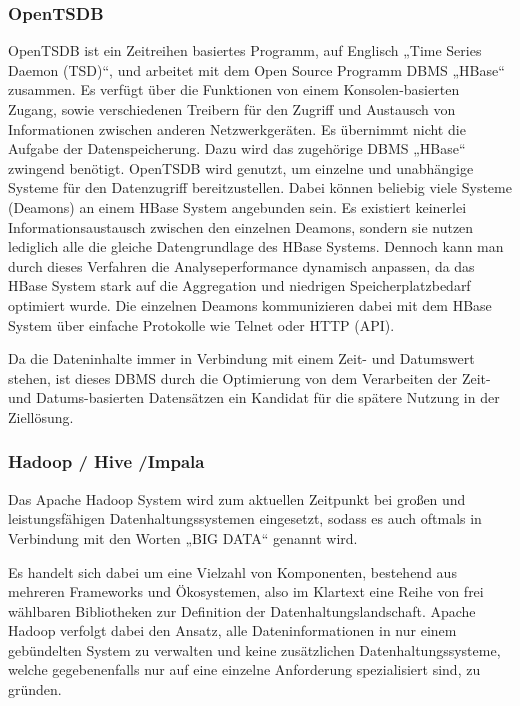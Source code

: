 \subsubsection{OpenTSDB}
\label{subsubsec:opentsdb}
OpenTSDB ist ein Zeitreihen basiertes Programm, auf Englisch „Time Series
Daemon (TSD)“, und arbeitet mit dem Open Source Programm \gls{DBMS} „HBase“
zusammen. Es verfügt über die Funktionen von einem Konsolen-basierten Zugang,
sowie verschiedenen Treibern für den Zugriff und Austausch von Informationen
zwischen anderen Netzwerkgeräten. Es übernimmt nicht die Aufgabe der
Datenspeicherung. Dazu wird das zugehörige \gls{DBMS} „HBase“ zwingend
benötigt. OpenTSDB wird genutzt, um einzelne und unabhängige Systeme für den
Datenzugriff bereitzustellen. Dabei können beliebig viele Systeme (Deamons) an
einem HBase System angebunden sein. Es existiert keinerlei
Informationsaustausch zwischen den einzelnen Deamons, sondern sie nutzen
lediglich alle die gleiche Datengrundlage des HBase Systems. Dennoch kann man
durch dieses Verfahren die Analyseperformance dynamisch anpassen, da das HBase
System stark auf die Aggregation und niedrigen Speicherplatzbedarf optimiert
wurde. Die einzelnen Deamons kommunizieren dabei mit dem HBase System über
einfache Protokolle wie Telnet oder HTTP (API).

Da die Dateninhalte immer in Verbindung mit einem Zeit- und Datumswert stehen,
ist dieses \gls{DBMS} durch die Optimierung von dem Verarbeiten der Zeit- und
Datums-basierten Datensätzen ein Kandidat für die spätere Nutzung in der
Ziellösung.
\nl%

\subsubsection{Hadoop / Hive /Impala}
\label{subsubsec:hadoop_hive_impala}
Das Apache Hadoop System wird zum aktuellen Zeitpunkt bei
großen und leistungsfähigen Datenhaltungssystemen eingesetzt, sodass es
auch oftmals in Verbindung mit den Worten „BIG DATA“ genannt wird.

Es handelt sich dabei um eine Vielzahl von Komponenten, bestehend aus mehreren
Frameworks und Ökosystemen, also im Klartext eine Reihe von frei wählbaren
Bibliotheken zur Definition der Datenhaltungslandschaft. Apache Hadoop verfolgt
dabei den Ansatz, alle Dateninformationen in nur einem gebündelten System zu
verwalten und keine zusätzlichen Datenhaltungssysteme, welche gegebenenfalls
nur auf eine einzelne Anforderung spezialisiert sind, zu gründen.

